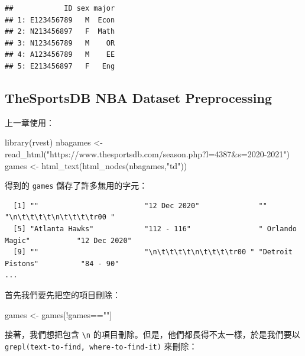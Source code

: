 \documentclass[
]{book}
\newenvironment{Shaded}{\begin{snugshade}}{\end{snugshade}}
\newcommand{\FunctionTok}[1]{\textcolor[rgb]{0.00,0.00,0.00}{#1}}
\newcommand{\NormalTok}[1]{#1}
\newcommand{\OtherTok}[1]{\textcolor[rgb]{0.56,0.35,0.01}{#1}}
\newcommand{\SpecialCharTok}[1]{\textcolor[rgb]{0.00,0.00,0.00}{#1}}
\newcommand{\StringTok}[1]{\textcolor[rgb]{0.31,0.60,0.02}{#1}}
\theoremstyle{definition}
\theoremstyle{remark}
\begin{document}
\begin{verbatim}
##            ID sex major
## 1: E123456789   M  Econ
## 2: N213456897   F  Math
## 3: N123456789   M    OR
## 4: A123456789   M    EE
## 5: E213456897   F   Eng
\end{verbatim}

\hypertarget{thesportsdb-nba-dataset-preprocessing}{%
\subsection{TheSportsDB NBA Dataset Preprocessing}\label{thesportsdb-nba-dataset-preprocessing}}

上一章使用：

\begin{Shaded}
\begin{Highlighting}[]
\FunctionTok{library}\NormalTok{(rvest)}
\NormalTok{nbagames }\OtherTok{\textless{}{-}} \FunctionTok{read\_html}\NormalTok{(}\StringTok{"https://www.thesportsdb.com/season.php?l=4387\&s=2020{-}2021"}\NormalTok{)}
\NormalTok{games }\OtherTok{\textless{}{-}} \FunctionTok{html\_text}\NormalTok{(}\FunctionTok{html\_nodes}\NormalTok{(nbagames,}\StringTok{"td"}\NormalTok{))}
\end{Highlighting}
\end{Shaded}

得到的 \texttt{games} 儲存了許多無用的字元：

\begin{verbatim}
  [1] ""                         "12 Dec 2020"              ""                         "\n\t\t\t\t\n\t\t\t\tr00 "
  [5] "Atlanta Hawks"            "112 - 116"                " Orlando Magic"           "12 Dec 2020"             
  [9] ""                         "\n\t\t\t\t\n\t\t\t\tr00 " "Detroit Pistons"          "84 - 90"       
...
\end{verbatim}

首先我們要先把空的項目刪除：

\begin{Shaded}
\begin{Highlighting}[]
\NormalTok{games }\OtherTok{\textless{}{-}}\NormalTok{ games[}\SpecialCharTok{!}\NormalTok{games}\SpecialCharTok{==}\StringTok{""}\NormalTok{]}
\end{Highlighting}
\end{Shaded}

接著，我們想把包含 \texttt{\textbackslash{}n} 的項目刪除。但是，他們都長得不太一樣，於是我們要以 \texttt{grepl(text-to-find,\ where-to-find-it)} 來刪除：
\end{document}
